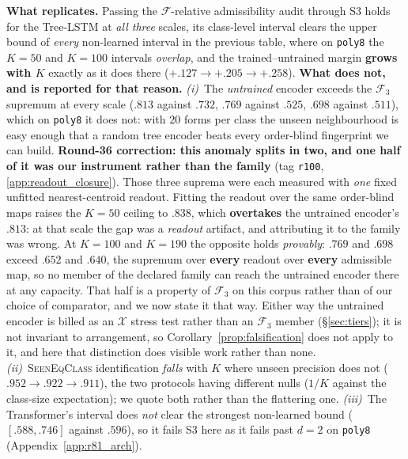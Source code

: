 \noindent \textbf{What replicates.} Passing the $\mathcal{F}$-relative admissibility audit through S3 holds for the Tree-LSTM at \emph{all three} scales, its class-level interval clears the upper bound of \emph{every} non-learned interval in the previous table, where on \texttt{poly8} the $K{=}50$ and $K{=}100$ intervals \emph{overlap}, and the trained--untrained margin \textbf{grows with $K$} exactly as it does there ($+.127 \to +.205 \to +.258$). \textbf{What does not, and is reported for that reason.} \emph{(i)}~The \emph{untrained} encoder exceeds the $\mathcal{F}_3$ supremum at every scale ($.813$ against $.732$, $.769$ against $.525$, $.698$ against $.511$), which on \texttt{poly8} it does not: with $20$ forms per class the unseen neighbourhood is easy enough that a random tree encoder beats every order-blind fingerprint we can build. \textbf{Round-36 correction: this anomaly splits in two, and one half of it was our instrument rather than the family} (tag \texttt{r100}, \ref{app:readout_closure}). Those three suprema were each measured with \emph{one} fixed unfitted nearest-centroid readout. Fitting the readout over the same order-blind maps raises the $K{=}50$ ceiling to $\mathbf{.838}$, which \textbf{overtakes} the untrained encoder's $.813$: at that scale the gap was a \emph{readout} artifact, and attributing it to the family was wrong. At $K{=}100$ and $K{=}190$ the opposite holds \emph{provably}: $.769$ and $.698$ exceed $.652$ and $.640$, the supremum over \textbf{every} readout over \textbf{every} admissible map, so no member of the declared family can reach the untrained encoder there at any capacity. That half is a property of $\mathcal{F}_3$ on this corpus rather than of our choice of comparator, and we now state it that way. Either way the untrained encoder is billed as an $\mathcal{X}$ stress test rather than an $\mathcal{F}_3$ member (\S\ref{sec:tiers}); it is not invariant to arrangement, so Corollary~\ref{prop:falsification} does not apply to it, and here that distinction does visible work rather than none. \emph{(ii)}~\textsc{SeenEqClass} identification \emph{falls} with $K$ where unseen precision does not ($.952 \to .922 \to .911$), the two protocols having different nulls ($1/K$ against the class-size expectation); we quote both rather than the flattering one. \emph{(iii)}~The Transformer's interval does \emph{not} clear the strongest non-learned bound ($[.588,.746]$ against $.596$), so it fails S3 here as it fails past $d{=}2$ on \texttt{poly8} (Appendix~\ref{app:r81_arch}).

